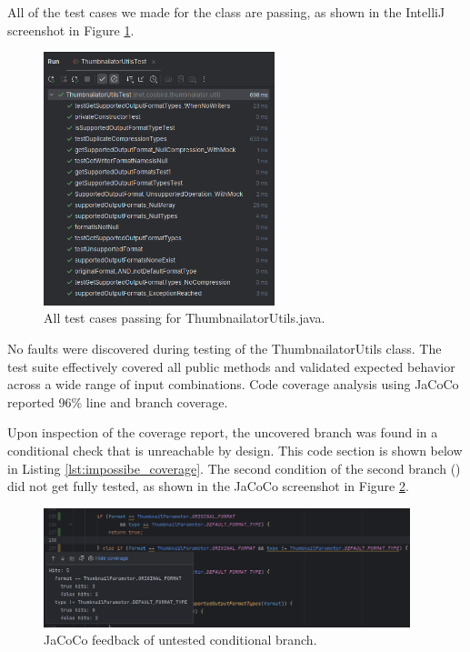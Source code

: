 \documentclass[12pt]{article}
\begin{document}
    All of the test cases we made for the  class
        are passing, as shown in the IntelliJ screenshot in Figure
        \ref{fig:thumnailator_utils_test_results}.
    \begin{figure}[H]
        \centering
        \includegraphics[width=0.6\textwidth]{images/thumnailator_utils_test_results.png}
        \caption[All test cases passing for ThumbnailatorUtils.java.]{All test cases passing for ThumbnailatorUtils.java.}
        \label{fig:thumnailator_utils_test_results}
    \end{figure}
    No faults were discovered during testing of the ThumbnailatorUtils class.
    The test suite effectively covered all public methods and validated expected
        behavior across a wide range of input combinations.
    Code coverage analysis using JaCoCo reported 96\% line and
        branch coverage.

    Upon inspection of the coverage report, the uncovered branch was found in a
        conditional check that is unreachable by design.
    This code section is shown below in Listing \ref{lst:impossibe_coverage}.
    The second condition of the second branch ()
        did not get fully tested, as shown in the JaCoCo screenshot in Figure
        \ref{fig:jacoco_impossible_coverage}.

    

    \begin{figure}[H]
        \centering
        \includegraphics[width=0.95\textwidth]{images/jacoco_impossible_coverage.png}
        \caption[JaCoCo feedback of untested conditional branch.]{JaCoCo feedback of untested conditional branch.}
        \label{fig:jacoco_impossible_coverage}
    \end{figure}
\end{document}
